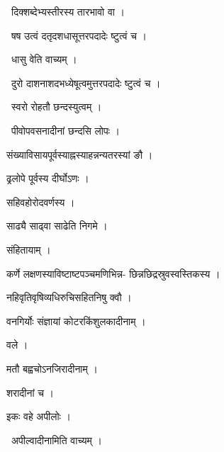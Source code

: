 \documentclass[10pt, openany, oneside]{book}
\begin{document}
\par\noindent\hspace{1.5em}{\vps वा॰}~{\qt दिक्शब्देभ्यस्तीरस्य तारभावो वा ।}

\par\noindent\hspace{1.5em}{\vps वा॰}~{\qt षष उत्वं दतृदशधासूत्तरपदादेः ष्टुत्वं च ।}

\par\noindent\hspace{1.5em}{\vps वा॰}~{\qt धासु वेति वाच्यम् ।}

\par\noindent\hspace{1.5em}{\vps वा॰}~{\qt दुरो दाशनाशदभध्येषूत्वमुत्तरपदादेः ष्टुत्वं च ।}

\par\noindent\hspace{1.5em}{\vps वा॰}~{\qt स्वरो रोहतौ छन्दस्युत्वम् ।}

\par\noindent\hspace{1.5em}{\vps वा॰}~{\qt पीवोपवसनादीनां छन्दसि लोपः ।}

\noindent संख्याविसायपूर्वस्याह्नस्याहन्नन्यतरस्यां ङौ ।

\noindent ढ्रलोपे पूर्वस्य दीर्घोऽणः ।

\noindent सहिवहोरोदवर्णस्य ।

\noindent साढ्यै साढ्वा साढेति निगमे ।

\noindent संहितायाम् ।

\noindent कर्णे लक्षणस्याविष्टाष्टपञ्चमणिभिन्न- छिन्नछिद्रस्रुवस्वस्तिकस्य ।

\noindent नहिवृतिवृषिव्यधिरुचिसहितनिषु क्वौ ।

\noindent वनगिर्योः संज्ञायां कोटरकिंशुलकादीनाम् ।

\noindent वले ।

\noindent मतौ बह्वचोऽनजिरादीनाम् ।

\noindent शरादीनां च ।

\noindent इकः वहे अपीलोः ।

\par\noindent\hspace{1.5em}{\vps वा॰}~{\qt अपील्वादीनामिति वाच्यम् ।}
\end{document}
